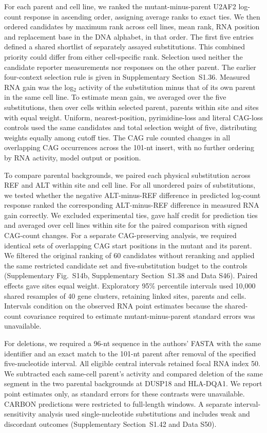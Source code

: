 \documentclass[webpdf,contemporary,large]{current_assets/oup-authoring-template}
\newcommand{\supfig}[1]{Supplementary Fig.~#1}
\newcommand{\supsect}[1]{Supplementary Section~#1}
\begin{document}
For each parent and cell line, we ranked the mutant-minus-parent U2AF2 log-count response in ascending order, assigning average ranks to exact ties. We then ordered candidates by maximum rank across cell lines, mean rank, RNA position and replacement base in the DNA alphabet, in that order. The first five entries defined a shared shortlist of separately assayed substitutions. This combined priority could differ from either cell-specific rank. Selection used neither the candidate reporter measurements nor responses on the other parent. The earlier four-context selection rule is given in \supsect{S1.36}. Measured RNA gain was the log$_2$ activity of the substitution minus that of its own parent in the same cell line. To estimate mean gain, we averaged over the five substitutions, then over cells within selected parent, parents within site and sites with equal weight. Uniform, nearest-position, pyrimidine-loss and literal CAG-loss controls used the same candidates and total selection weight of five, distributing weights equally among cutoff ties. The CAG rule counted changes in all overlapping CAG occurrences across the 101-nt insert, with no further ordering by RNA activity, model output or position.

To compare parental backgrounds, we paired each physical substitution across REF and ALT within site and cell line. For all unordered pairs of substitutions, we tested whether the negative ALT-minus-REF difference in predicted log-count response ranked the corresponding ALT-minus-REF difference in measured RNA gain correctly. We excluded experimental ties, gave half credit for prediction ties and averaged over cell lines within site for the paired comparison with signed CAG-count changes. For a separate CAG-preserving analysis, we required identical sets of overlapping CAG start positions in the mutant and its parent. We filtered the original ranking of 60 candidates without reranking and applied the same restricted candidate set and five-substitution budget to the controls (\supfig{S14b}, \supsect{S1.38} and Data S46). Paired effects gave sites equal weight. Exploratory 95\% percentile intervals used 10,000 shared resamples of 40 gene clusters, retaining linked sites, parents and cells. Intervals condition on the observed RNA point estimates because the shared-count covariance required to estimate mutant-minus-parent standard errors was unavailable.

For deletions, we required a 96-nt sequence in the authors' FASTA with the same identifier and an exact match to the 101-nt parent after removal of the specified five-nucleotide interval. All eligible central intervals retained focal RNA index 50. We subtracted each same-cell parent's activity and compared deletion of the same segment in the two parental backgrounds at DUSP18 and HLA-DQA1. We report point estimates only, as standard errors for these contrasts were unavailable. CARBON predictions were restricted to full-length windows. A separate interval-sensitivity analysis used single-nucleotide substitutions and includes weak and discordant outcomes (\supsect{S1.42} and Data S50).
\end{document}
